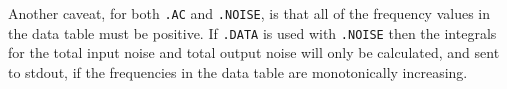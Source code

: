 \begin{Command}
Another caveat, for both \texttt{.AC} and \texttt{.NOISE}, is that all of the frequency
values in the data table must be positive.  If \texttt{.DATA} is used with \texttt{.NOISE}
then the integrals for the total input noise and total output noise will only be calculated,
and sent to stdout, if the frequencies in the data table are monotonically increasing.

\end{Command}
